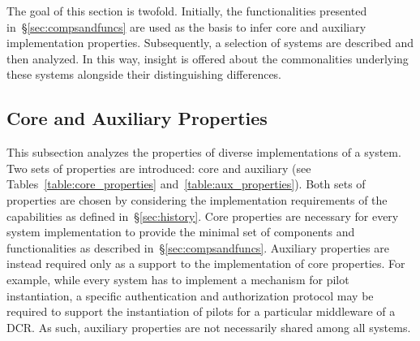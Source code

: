 \documentclass{sig-alternate}
\begin{document}

The goal of this section is twofold. Initially, the \pilot functionalities
presented in~\S\ref{sec:compsandfuncs} are used as the basis to infer core and
auxiliary \pilot implementation properties. Subsequently, a selection of \pilot
systems are described and then analyzed. In this way, insight is offered about
the commonalities underlying these systems alongside their distinguishing
differences.


 

%
\subsection{Core and Auxiliary Properties}
\label{sec:properties}

This subsection analyzes the properties of diverse implementations of a \pilot
system. Two sets of properties are introduced: core and auxiliary (see
Tables~\ref{table:core_properties} and~\ref{table:aux_properties}). Both sets of
properties are chosen by considering the implementation requirements of the
\pilot capabilities as defined in~\S\ref{sec:history}. Core properties are
necessary for every \pilot system implementation to provide the minimal set of
components and functionalities as described in~\S\ref{sec:compsandfuncs}.
Auxiliary properties are instead required only as a support to the
implementation of core properties. For example, while every \pilot system has to
implement a mechanism for pilot instantiation, a specific authentication and
authorization protocol may be required to support the instantiation of pilots
for a particular middleware of a DCR. As such, auxiliary properties are not
necessarily shared among all \pilot systems.


\end{document}
